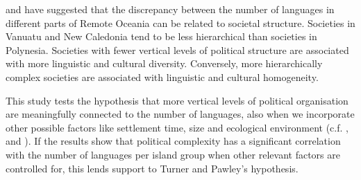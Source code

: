 \documentclass[unnumsec,webpdf,modern,medium]{oup-authoring-template}
\begin{document}
\citet{turner1884} and \citet{pawley81,pawley2007} have suggested that the discrepancy between the number of languages in different parts of Remote Oceania can be related to societal structure. Societies in Vanuatu and New Caledonia tend to be less hierarchical than societies in Polynesia. Societies with fewer vertical levels of political structure are associated with more linguistic and cultural diversity. Conversely, more hierarchically complex societies are associated with linguistic and cultural homogeneity.


This study tests the hypothesis that more vertical levels of political organisation are meaningfully connected to the number of languages, also when we incorporate other possible factors like settlement time, size and ecological environment (c.f. \citet{NETTLE1998}, \citet{gavin2012island} and \citet{hua2019ecological}). If the results show that political complexity has a significant correlation with the number of languages per island group when other relevant factors are controlled for, this lends support to Turner and Pawley's hypothesis.
 


\FloatBarrier
\end{document}
